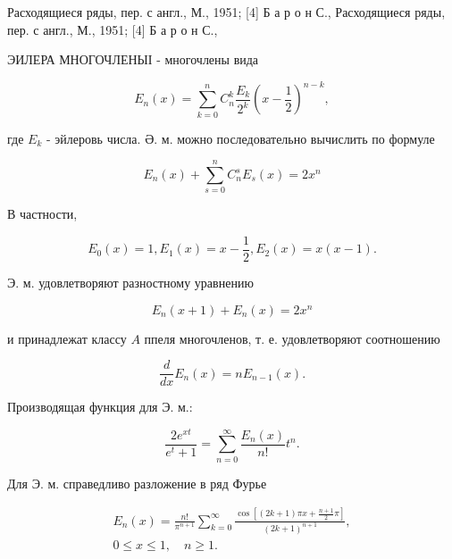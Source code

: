 \documentclass[10pt]{article}
\begin{document}
Расходящиеся ряды, пер. с англ., М., 1951; [4] Б а р о н С., Расходящиеся ряды, пер. с англ., М., 1951; [4] Б а р о н С.,



ЭИЛЕРА МНОГОЧЛЕНЫІ - многочлены вида



\[

E_{n}(x)=\sum_{k=0}^{n} C_{n}^{k} \frac{E_{k}}{2^{k}}\left(x-\frac{1}{2}\right)^{n-k},

\]



где $E_{k}$ - эйлеровь числа. Ә. м. можно последовательно вычислить по формуле



\[

E_{n}(x)+\sum_{s=0}^{n} C_{n}^{s} E_{s}(x)=2 x^{n}

\]



В частности,



\[

E_{0}(x)=1, E_{1}(x)=x-\frac{1}{2}, E_{2}(x)=x(x-1) .

\]



Э. м. удовлетворяют разностному уравнению



\[

E_{n}(x+1)+E_{n}(x)=2 x^{n}

\]



и принадлежат классу $A$ ппеля многочленов, т. е. удовлетворяют соотношению



\[

\frac{d}{d x} E_{n}(x)=n E_{n-1}(x) .

\]



Производящая функция для Э. м.:



\[

\frac{2 e^{x t}}{e^{t}+1}=\sum_{n=0}^{\infty} \frac{E_{n}(x)}{n !} t^{n} .

\]



Для Э. м. справедливо разложение в ряд Фурье



\[

\begin{gathered}

E_{n}(x)=\frac{n !}{\pi^{n+1}} \sum_{k=0}^{\infty} \frac{\cos \left[(2 k+1) \pi x+\frac{n+1}{2} \pi\right]}{(2 k+1)^{n+1}}, \\

0 \leqslant x \leqslant 1, \quad n \geqslant 1 .

\end{gathered}

\]
\end{document}
